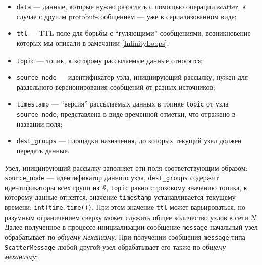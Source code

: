 \documentclass{article}
\theoremstyle{plain}
\theoremstyle{plain}
\theoremstyle{plain}
\theoremstyle{plain}
\theoremstyle{definition}
\theoremstyle{remark}
\theoremstyle{plain}
\begin{document}
\begin{itemize}
    \item \texttt{data} --- данные, которые нужно разослать с помощью операции scatter, в случае с другим protobuf-сообщением --- уже в сериализованном виде;
    
    \item \texttt{ttl} --- TTL-поле для борьбы с \enquote{гуляющими} сообщениями, возникновение которых мы описали в замечании \ref{InfinityLoops};
    
    \item \texttt{topic} --- топик, к которому рассылаемые данные относятся;
    
    \item \texttt{source\_node} --- идентификатор узла, инициирующий рассылку, нужен для раздельного версионирования сообщений от разных источников;
    
    \item \texttt{timestamp} --- \enquote{версия} рассылаемых данных в топике \texttt{topic} от узла \texttt{source\_node}, представлена в виде временной отметки, что отражено в названии поля;
    
    \item \texttt{dest\_groups} --- площадки назначения, до которых текущий узел должен передать данные.
\end{itemize}

Узел, инициирующий рассылку заполняет эти поля соответствующим образом: \\
\texttt{source\_node} --- идентификатор данного узла, \texttt{dest\_groups} содержит идентификаторы всех групп из $\mathcal{S}$, \texttt{topic} равно строковому значению топика, к которому данные отнсятся, значение \texttt{timestamp} устанавливается текущему времени: \texttt{int(time.time())}. При этом значение \texttt{ttl} может варьироваться, но разумным ограничением сверху может служить общее количество узлов в сети $N$. Далее полученное в процессе инициализации сообщение \texttt{message} начальный узел обрабатывает по \textit{общему механизму}. При получении сообщения \texttt{message} типа \texttt{ScatterMessage} любой другой узел обрабатывает его также по \textit{общему механизму}:
\end{document}
